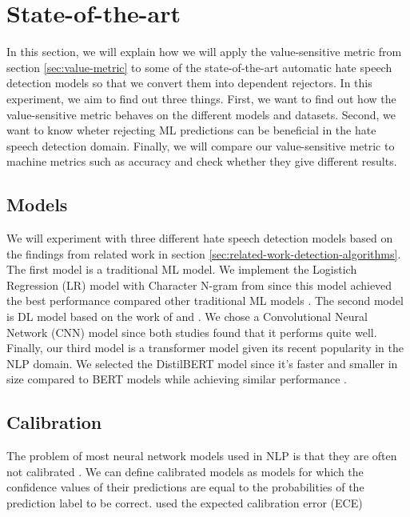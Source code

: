 \section{State-of-the-art}
\label{sec:state-of-the-art}
In this section, we will explain how we will apply the value-sensitive metric from section \ref{sec:value-metric} to some of the state-of-the-art automatic hate speech detection models so that we convert them into dependent rejectors.
%
In this experiment, we aim to find out three things.
%
First, we want to find out how the value-sensitive metric behaves on the different models and datasets.
%
Second, we want to know wheter rejecting ML predictions can be beneficial in the hate speech detection domain.
%
Finally, we will compare our value-sensitive metric to machine metrics such as accuracy and check whether they give different results.
%

\subsection{Models}
We will experiment with three different hate speech detection models based on the findings from related work in section \ref{sec:related-work-detection-algorithms}.
%
The first model is a traditional ML model.
%
We implement the Logistich Regression (LR) model with Character N-gram from \citet{waseem2016hateful} since this model achieved the best performance compared other traditional ML models \citet{davidson2017automated}.
%
The second model is DL model based on the work of \citet{agrawal2018deep} and \citet{badjatiya2017deep}.
%
We chose a Convolutional Neural Network (CNN) model since both studies found that it performs quite well.
%
Finally, our third model is a transformer model given its recent popularity in the NLP domain.
%
We selected the DistilBERT model since it's faster and smaller in size compared to BERT models while achieving similar performance \citep{sanh2019distilbert}.

\subsection{Calibration}
The problem of most neural network models used in NLP is that they are often not calibrated \citep{guo2017calibration}.
%
We can define calibrated models as models for which the confidence values of their predictions are equal to the probabilities of the prediction label to be correct.
%
\citet{guo2017calibration} used the expected calibration error (ECE)

